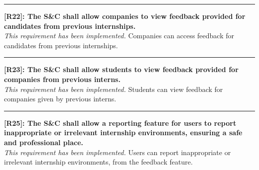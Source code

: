 \noindent\rule{16cm}{0.4pt}

\noindent\textbf{[R22]: The S\&C shall allow companies to view feedback provided for candidates from previous internships.} \\
\textit{This requirement has been implemented.} Companies can access feedback for candidates from previous internships.

\noindent\rule{16cm}{0.4pt}

\noindent\textbf{[R23]: The S\&C shall allow students to view feedback provided for companies from previous interns.} \\
\textit{This requirement has been implemented.} Students can view feedback for companies given by previous interns.

\noindent\rule{16cm}{0.4pt}

\noindent\textbf{[R25]: The S\&C shall allow a reporting feature for users to report inappropriate or irrelevant internship environments, ensuring a safe and professional place.} \\
\textit{This requirement has been implemented.} Users can report inappropriate or irrelevant internship environments, from the feedback feature.


